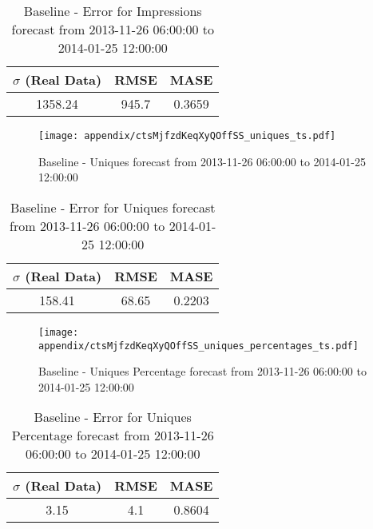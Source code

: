 \begin{table}[H]
\centering
\footnotesize
\begin{tabular}{ccc}
$\sigma$ (Real Data) & RMSE & MASE   \\ \hline
1358.24 & 945.7 & 0.3659 \\
\end{tabular}

\vspace{0.5cm}

\caption{
Baseline - Error for Impressions forecast from 2013-11-26 06:00:00 to 2014-01-25 12:00:00}
\end{table}

\begin{figure}[H] \begin{center} \leavevmode
\texttt{[image: appendix/ctsMjfzdKeqXyQOffSS\_uniques\_ts.pdf]} \caption{
Baseline - Uniques forecast from 2013-11-26 06:00:00 to 2014-01-25 12:00:00} \label{fig:appendix/ctsMjfzdKeqXyQOffSS_uniques_ts.pdf} \end{center}
\end{figure}

\begin{table}[H]
\centering
\footnotesize
\begin{tabular}{ccc}
$\sigma$ (Real Data) & RMSE & MASE   \\ \hline
158.41 & 68.65 & 0.2203 \\
\end{tabular}

\vspace{0.5cm}

\caption{
Baseline - Error for Uniques forecast from 2013-11-26 06:00:00 to 2014-01-25 12:00:00}
\end{table}

\begin{figure}[H] \begin{center} \leavevmode
\texttt{[image: appendix/ctsMjfzdKeqXyQOffSS\_uniques\_percentages\_ts.pdf]} \caption{
Baseline - Uniques Percentage forecast from 2013-11-26 06:00:00 to 2014-01-25 12:00:00} \label{fig:appendix/ctsMjfzdKeqXyQOffSS_uniques_percentages_ts.pdf} \end{center}
\end{figure}

\begin{table}[H]
\centering
\footnotesize
\begin{tabular}{ccc}
$\sigma$ (Real Data) & RMSE & MASE   \\ \hline
3.15 & 4.1 & 0.8604 \\
\end{tabular}

\vspace{0.5cm}

\caption{
Baseline - Error for Uniques Percentage forecast from 2013-11-26 06:00:00 to 2014-01-25 12:00:00}
\end{table}

